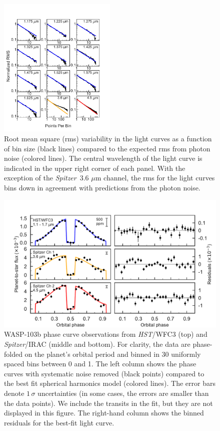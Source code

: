 \documentclass[twocolumn, trackchanges]{aastex61}
\newcommand{\project}[1]{\textsl{#1}}
\newcommand{\HST}{\project{HST}}
\newcommand{\Spitzer}{\project{Spitzer}}
\begin{document}
\begin{figure}
\includegraphics[width = 0.5\textwidth]{fig4.pdf}
\caption{Root mean square (rms) variability in the light curves as a function of bin size (black lines) compared to the expected rms from photon noise (colored lines). The central wavelength of the light curve is indicated in the upper right corner of each panel. With the exception of the \Spitzer\ 3.6 $\mu$m channel, the rms for the light curves bins down in agreement with predictions from the photon noise.}
\label{fig:rms}
\end{figure}


\begin{figure}
\includegraphics[width = 1.0\textwidth]{fig5.pdf}
\caption{WASP-103b phase curve observations from \HST/WFC3 (top) and \Spitzer/IRAC (middle and bottom). For clarity, the data are phase-folded on the planet's orbital period and binned in 30 uniformly spaced bins between 0 and 1. The left column shows the phase curves with systematic noise removed (black points) compared to the best fit spherical harmonics model (colored lines). The error bars denote $1\,\sigma$ uncertainties (in some cases, the errors are smaller than the data points).  We include the transits in the fit, but they are not displayed in this figure. The right-hand column shows the binned residuals for the best-fit light curve. }
\label{fig:phasecurves}
\end{figure}
\end{document}

